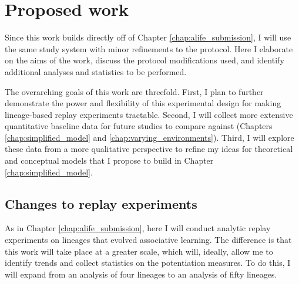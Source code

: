 \section{Proposed work}

Since this work builds directly off of Chapter \ref{chap:alife_submission}, I will use the same study system with minor refinements to the protocol.
Here I elaborate on the aims of the work, discuss the protocol modifications used, and identify additional analyses and statistics to be performed. 


The overarching goals of this work are threefold.
First, I plan to further demonstrate the power and flexibility of this experimental design for making lineage-based replay experiments tractable.
Second, I will collect more extensive quantitative baseline data for future studies to compare against (Chapters \ref{chap:simplified_model} and \ref{chap:varying_environments}).
Third, I will explore these data from a more qualitative perspective to refine my ideas for theoretical and conceptual models that I propose to build in Chapter \ref{chap:simplified_model}. 

\subsection{Changes to replay experiments}

As in Chapter \ref{chap:alife_submission}, here I will conduct analytic replay experiments on lineages that evolved associative learning. 
The difference is that this work will take place at a greater scale, which will, ideally, allow me to identify trends and collect statistics on the potentiation measures. 
To do this, I will expand from an analysis of four lineages to an analysis of fifty lineages. 


